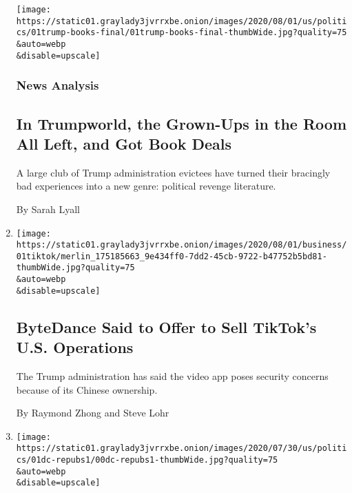 \begin{enumerate}
  \texttt{[image: https://static01.graylady3jvrrxbe.onion/images/2020/08/01/us/politics/01trump-books-final/01trump-books-final-thumbWide.jpg?quality=75\\\&auto=webp\\\&disable=upscale]}

  \hypertarget{news-analysis-1}{%
  \subsubsection{News Analysis}\label{news-analysis-1}}

  \hypertarget{in-trumpworld-the-grown-ups-in-the-room-all-left-and-got-book-deals-1}{%
  \subsection{In Trumpworld, the Grown-Ups in the Room All Left, and Got
  Book
  Deals}\label{in-trumpworld-the-grown-ups-in-the-room-all-left-and-got-book-deals-1}}

  A large club of Trump administration evictees have turned their
  bracingly bad experiences into a new genre: political revenge
  literature.

  By Sarah Lyall
\item
  \href{/2020/08/01/technology/tiktok-sale-trump-ban.html}{}

  \texttt{[image: https://static01.graylady3jvrrxbe.onion/images/2020/08/01/business/01tiktok/merlin\_175185663\_9e434ff0-7dd2-45cb-9722-b47752b5bd81-thumbWide.jpg?quality=75\\\&auto=webp\\\&disable=upscale]}

  \hypertarget{bytedance-said-to-offer-to-sell-tiktoks-us-operations}{%
  \subsection{ByteDance Said to Offer to Sell TikTok's U.S.
  Operations}\label{bytedance-said-to-offer-to-sell-tiktoks-us-operations}}

  The Trump administration has said the video app poses security
  concerns because of its Chinese ownership.

  By Raymond Zhong and Steve Lohr
\item
  \href{/2020/08/01/us/politics/trump-suburban-voters-republicans-house.html}{}

  \texttt{[image: https://static01.graylady3jvrrxbe.onion/images/2020/07/30/us/politics/01dc-repubs1/00dc-repubs1-thumbWide.jpg?quality=75\\\&auto=webp\\\&disable=upscale]}

  \hypertarget{alienated-by-trump-suburban-voters-sour-on-gop-in-battle-for-the-house-1}{%
}
\end{enumerate}
